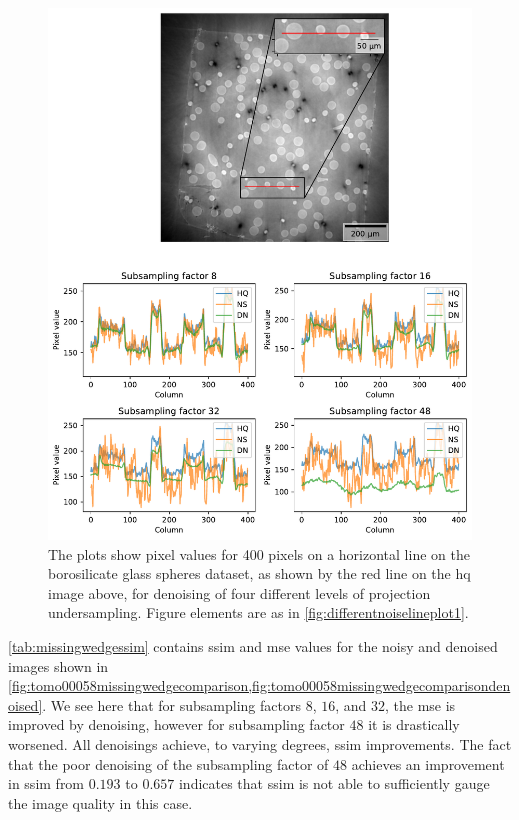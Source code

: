 \begin{figure}[htbp]
  \centering
  \includegraphics[width=.95\textwidth]{figures/differentnoiselineplot2.pdf}
  \caption[Pixel value plot of denoising of different levels of projection undersampling on the borosilicate glass spheres dataset]{The plots show pixel values for 400 pixels on a horizontal line on the borosilicate glass spheres dataset, as shown by the red line on the \gls{hq} image above, for denoising of four different levels of projection undersampling. Figure elements are as in \cref{fig:differentnoiselineplot1}. }
  \label{fig:differentnoiselineplot2}
\end{figure}

\cref{tab:missingwedgessim} contains \gls{ssim} and \gls{mse} values for the noisy and denoised images shown in \cref{fig:tomo00058missingwedgecomparison,fig:tomo00058missingwedgecomparisondenoised}. We see here that for subsampling factors $8$, $16$, and $32$, the \gls{mse} is improved by denoising, however for subsampling factor $48$ it is drastically worsened. All denoisings achieve, to varying degrees, \gls{ssim} improvements. The fact that the poor denoising of the subsampling factor of $48$ achieves an improvement in \gls{ssim} from $0.193$ to $0.657$ indicates that \gls{ssim} is not able to sufficiently gauge the image quality in this case. 

